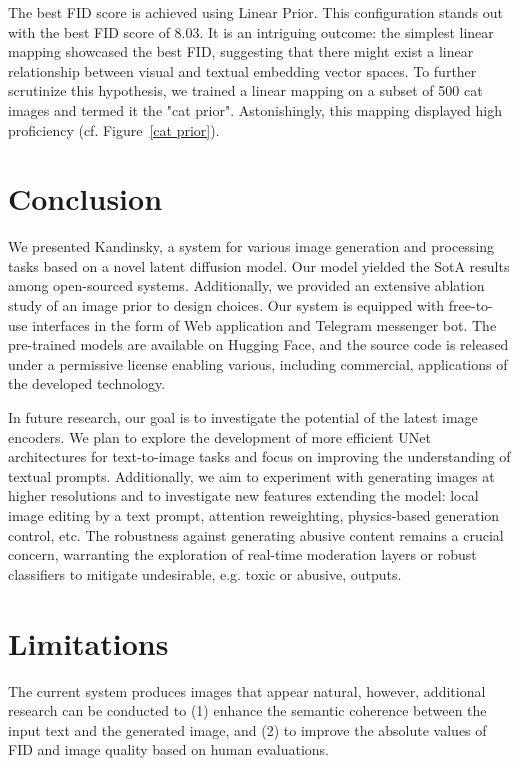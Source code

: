 \documentclass[11pt]{article}
\begin{document}
The best FID score is achieved using Linear Prior. This configuration stands out with the best FID score of 8.03. It is an intriguing outcome: the simplest linear mapping showcased the best FID, suggesting that there might exist a linear relationship between visual and textual embedding vector spaces. To further scrutinize this hypothesis, we trained a linear mapping on a subset of 500 cat images and termed it the "cat prior". Astonishingly, this mapping displayed high proficiency (cf. Figure~\ref{cat prior}).


\section{Conclusion}

We presented Kandinsky, a system for various image generation and processing tasks based on a novel latent diffusion model. Our model yielded the SotA results among open-sourced systems. Additionally, we provided an extensive ablation study of an image prior to design choices. Our system is equipped with free-to-use interfaces in the form of Web application and Telegram messenger bot. The pre-trained models are available on Hugging Face, and the source code is released under a permissive license enabling various, including commercial, applications of the developed technology. 

In future research, our goal is to investigate the potential of the latest image encoders. We plan to explore the development of more efficient UNet architectures for text-to-image tasks and focus on improving the understanding of textual prompts. Additionally, we aim to experiment with generating images at higher resolutions and to investigate new features extending the model: local image editing by a text prompt, attention reweighting, physics-based generation control, etc. The robustness against generating abusive content remains a crucial concern, warranting the exploration of real-time moderation layers or robust classifiers to mitigate undesirable, e.g. toxic or abusive, outputs.

\section{Limitations} 

The current system produces images that appear natural, however, additional research can be conducted to (1) enhance the semantic coherence between the input text and the generated image, and (2) to improve the absolute values of FID and image quality based on human evaluations.
\end{document}
